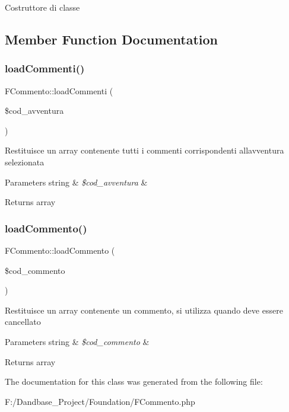 Costruttore di classe 

\subsection{Member Function Documentation}
\mbox{\label{class_f_commento_aa10e3f0355ea0f0a31a14063a4d0318d}} 
\subsubsection{\texorpdfstring{load\+Commenti()}{loadCommenti()}}
{\footnotesize\ttfamily F\+Commento\+::load\+Commenti (\begin{DoxyParamCaption}\item[{}]{\$cod\+\_\+avventura }\end{DoxyParamCaption})}

Restituisce un array contenente tutti i commenti corrispondenti all\textquotesingle{}avventura selezionata


\begin{DoxyParams}[1]{Parameters}
string & {\em \$cod\+\_\+avventura} & \\
\hline
\end{DoxyParams}
\begin{DoxyReturn}{Returns}
array 
\end{DoxyReturn}
\mbox{\label{class_f_commento_a575ec007020823deec1607b1acdc6d82}} 
\subsubsection{\texorpdfstring{load\+Commento()}{loadCommento()}}
{\footnotesize\ttfamily F\+Commento\+::load\+Commento (\begin{DoxyParamCaption}\item[{}]{\$cod\+\_\+commento }\end{DoxyParamCaption})}

Restituisce un array contenente un commento, si utilizza quando deve essere cancellato


\begin{DoxyParams}[1]{Parameters}
string & {\em \$cod\+\_\+commento} & \\
\hline
\end{DoxyParams}
\begin{DoxyReturn}{Returns}
array 
\end{DoxyReturn}


The documentation for this class was generated from the following file\+:\begin{DoxyCompactItemize}
\item 
F\+:/\+Dandbase\+\_\+\+Project/\+Foundation/F\+Commento.\+php\end{DoxyCompactItemize}
